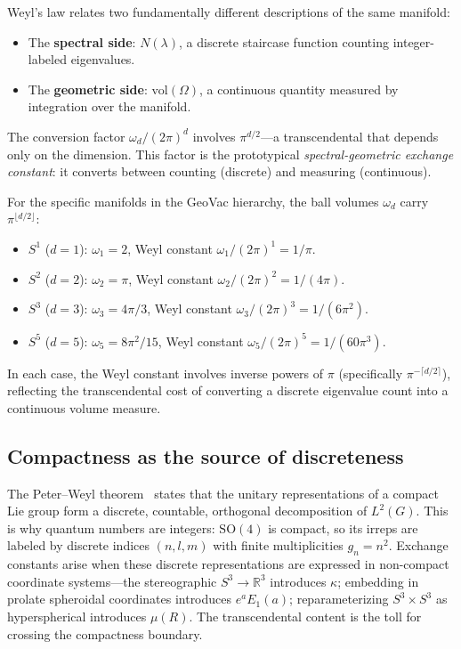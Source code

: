 \documentclass[aps,pra,twocolumn,superscriptaddress,longbibliography]{revtex4-2}
\begin{document}
Weyl's law relates two fundamentally different descriptions
of the same manifold:
\begin{itemize}
  \item The \textbf{spectral side}: $N(\lambda)$, a discrete
    staircase function counting integer-labeled eigenvalues.
  \item The \textbf{geometric side}: $\mathrm{vol}(\Omega)$, a
    continuous quantity measured by integration over the manifold.
\end{itemize}
The conversion factor $\omega_d / (2\pi)^d$ involves
$\pi^{d/2}$---a transcendental that depends only on the
dimension.  This factor is the prototypical
\textit{spectral-geometric exchange constant}: it converts
between counting (discrete) and measuring (continuous).

For the specific manifolds in the GeoVac hierarchy, the ball
volumes $\omega_d$ carry $\pi^{\lfloor d/2 \rfloor}$:
\begin{itemize}
  \item $S^1$ ($d = 1$): $\omega_1 = 2$,
    Weyl constant $\omega_1/(2\pi)^1 = 1/\pi$.
  \item $S^2$ ($d = 2$): $\omega_2 = \pi$,
    Weyl constant $\omega_2/(2\pi)^2 = 1/(4\pi)$.
  \item $S^3$ ($d = 3$): $\omega_3 = 4\pi/3$,
    Weyl constant $\omega_3/(2\pi)^3 = 1/(6\pi^2)$.
  \item $S^5$ ($d = 5$): $\omega_5 = 8\pi^2/15$,
    Weyl constant $\omega_5/(2\pi)^5 = 1/(60\pi^3)$.
\end{itemize}
In each case, the Weyl constant involves inverse powers of $\pi$
(specifically $\pi^{-\lceil d/2 \rceil}$), reflecting the
transcendental cost of converting a discrete eigenvalue count
into a continuous volume measure.

\subsection{Compactness as the source of discreteness}

The Peter--Weyl theorem~\cite{peter_weyl1927} states that the unitary
representations of a compact Lie group form a discrete, countable,
orthogonal decomposition of $L^2(G)$.  This is why quantum numbers are
integers: $\mathrm{SO}(4)$ is compact, so its irreps are labeled by
discrete indices $(n, l, m)$ with finite multiplicities $g_n = n^2$.
Exchange constants arise when these discrete representations are
expressed in non-compact coordinate systems---the stereographic
$S^3 \to \mathbb{R}^3$ introduces $\kappa$; embedding in prolate
spheroidal coordinates introduces $e^a E_1(a)$; reparameterizing
$S^3 \times S^3$ as hyperspherical introduces $\mu(R)$.  The
transcendental content is the toll for crossing the compactness
boundary.
\end{document}
